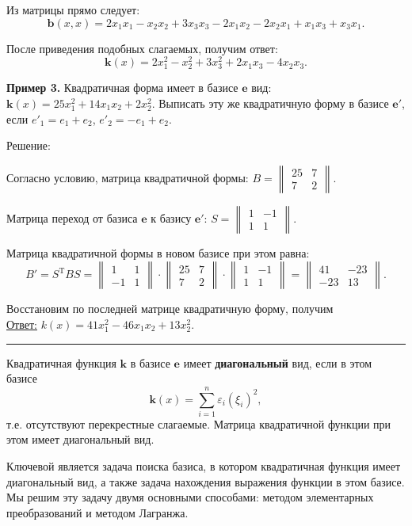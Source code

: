 Из матрицы прямо следует:$$\mathbf{b}(x,x)=2x_1x_1-x_2x_2+3x_3x_3-2x_1x_2-2x_2x_1+x_1x_3+x_3x_1.$$

После приведения подобных слагаемых, получим ответ:$$\mathbf{k}(x)=2x_1^2-x_2^2+3x_3^2+2x_1x_3-4x_2x_3.$$

\textbf{Пример 3.} Квадратичная форма имеет в базисе $\mathbf{e}$ вид: $\textbf{k}(x)=25x^2_1+14x_1x_2+2x^2_2.$ Выписать эту же квадратичную форму в базисе $\mathbf{e}'$, если $e'_1=e_1+e_2$, $e'_2=-e_1+e_2$.
\begin{center}
Решение:
\end{center}

Согласно условию, матрица квадратичной формы: $B=\begin{Vmatrix}
25 & 7\\
7 & 2
\end{Vmatrix}.$

Матрица переход от базиса $\mathbf{e}$ к базису $\mathbf{e}'$: $S=\begin{Vmatrix}
1 & -1\\
1 & 1
\end{Vmatrix}.$

Матрица квадратичной формы в новом базисе при этом равна:$$B'=S^{\text{T}}BS=\begin{Vmatrix}
1 & 1\\
-1 & 1
\end{Vmatrix}\cdot\begin{Vmatrix}
25 & 7\\
7 & 2
\end{Vmatrix}\cdot\begin{Vmatrix}
1 & -1\\
1 & 1
\end{Vmatrix}=\begin{Vmatrix}
41 & -23\\
-23 & 13
\end{Vmatrix}.$$

Восстановим по последней матрице квадратичную форму, получим\\

\underline{Ответ:} $k(x)=41x^2_1-46x_1x_2+13x^2_2.$\\\rule{29cm}{.20mm}

Квадратичная функция $\mathbf{k}$ в базисе $\mathbf{e}$ имеет \textbf{диагональный} вид, если в этом базисе$$\textbf{k}(x)=\sum_{i=1}^n\varepsilon_i(\xi_i)^2,$$
т.е. отсутствуют перекрестные слагаемые. Матрица квадратичной функции при этом имеет диагональный вид.

Ключевой является задача поиска базиса, в котором квадратичная функция имеет диагональный вид, а также задача нахождения выражения функции в этом базисе. Мы решим эту задачу двумя основными способами: методом элементарных преобразований и методом Лагранжа.

